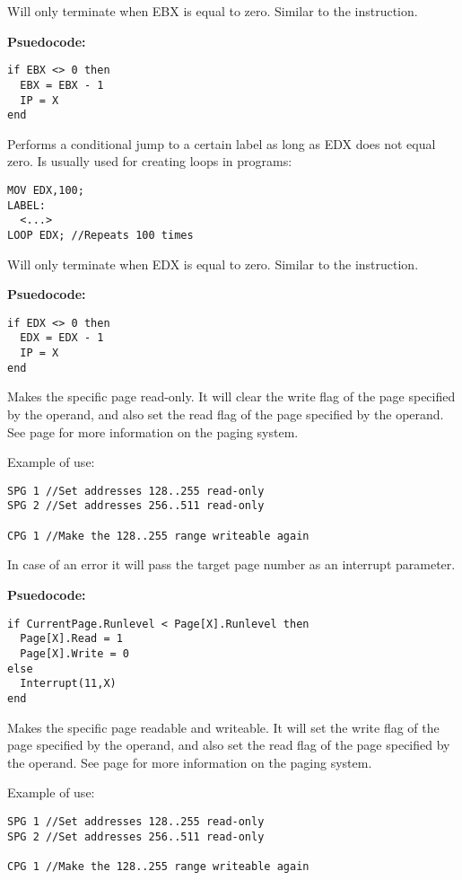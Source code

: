 Will only terminate when EBX is equal to zero. Similar to the  instruction.

\textbf{Psuedocode:}
\begin{verbatim}
if EBX <> 0 then
  EBX = EBX - 1
  IP = X
end
\end{verbatim}


Performs a conditional jump to a certain label as long as EDX does not equal zero. Is usually used for creating loops in programs:
\begin{verbatim}
MOV EDX,100;
LABEL:
  <...>
LOOP EDX; //Repeats 100 times
\end{verbatim}

Will only terminate when EDX is equal to zero. Similar to the  instruction.

\textbf{Psuedocode:}
\begin{verbatim}
if EDX <> 0 then
  EDX = EDX - 1
  IP = X
end
\end{verbatim}


Makes the specific page read-only. It will clear the write flag of the page specified by the operand, and also set the read flag of the page specified by the operand. See page \pageref{paging} for more information on the paging system.

Example of use:
\begin{verbatim}
SPG 1 //Set addresses 128..255 read-only
SPG 2 //Set addresses 256..511 read-only

CPG 1 //Make the 128..255 range writeable again
\end{verbatim}


\intrpriv

In case of an error it will pass the target page number as an interrupt parameter.

\textbf{Psuedocode:}
\begin{verbatim}
if CurrentPage.Runlevel < Page[X].Runlevel then
  Page[X].Read = 1
  Page[X].Write = 0
else
  Interrupt(11,X)
end
\end{verbatim}


Makes the specific page readable and writeable. It will set the write flag of the page specified by the operand, and also set the read flag of the page specified by the operand. See page \pageref{paging} for more information on the paging system.

Example of use:
\begin{verbatim}
SPG 1 //Set addresses 128..255 read-only
SPG 2 //Set addresses 256..511 read-only

CPG 1 //Make the 128..255 range writeable again
\end{verbatim}

